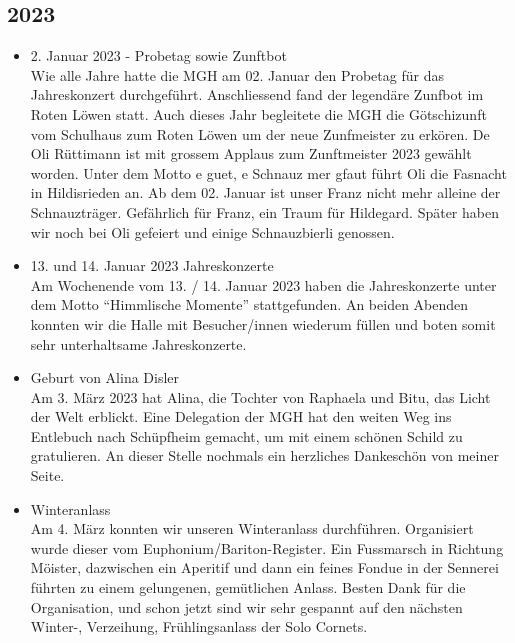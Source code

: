 \subsection*{2023}
\begin{history}


      \begin{itemize}

            \item 2. Januar 2023 - Probetag sowie Zunftbot\\
                  Wie alle Jahre hatte die MGH am 02. Januar den Probetag für
                  das Jahreskonzert durchgeführt. Anschliessend fand der
                  legendäre Zunfbot im Roten Löwen statt. Auch dieses Jahr
                  begleitete die MGH die Götschizunft vom Schulhaus zum Roten
                  Löwen um der neue Zunfmeister zu erkören. De Oli Rüttimann ist
                  mit grossem Applaus zum Zunftmeister 2023 gewählt worden.
                  Unter dem Motto e guet, e Schnauz mer gfaut führt Oli die
                  Fasnacht in Hildisrieden an. Ab dem 02. Januar ist unser Franz
                  nicht mehr alleine der Schnauzträger. Gefährlich für Franz,
                  ein Traum für Hildegard. Später haben wir noch bei Oli
                  gefeiert und einige Schnauzbierli genossen.

            \item 13. und 14. Januar 2023 Jahreskonzerte\\
                  Am Wochenende vom 13. / 14. Januar 2023 haben die
                  Jahreskonzerte unter dem Motto \enquote{Himmlische Momente}
                  stattgefunden. An beiden Abenden konnten wir die Halle mit
                  Besucher/innen wiederum füllen und boten somit sehr
                  unterhaltsame Jahreskonzerte.

            \item  Geburt von Alina Disler\\
                  Am 3. März 2023 hat Alina, die Tochter von Raphaela und Bitu,
                  das Licht der Welt erblickt. Eine Delegation der MGH hat den
                  weiten Weg ins Entlebuch nach Schüpfheim gemacht, um mit einem
                  schönen Schild zu gratulieren. An dieser Stelle nochmals ein
                  herzliches Dankeschön von meiner Seite.

            \item Winteranlass\\
                  Am 4. März konnten wir unseren Winteranlass durchführen.
                  Organisiert wurde dieser vom Euphonium/Bariton-Register. Ein
                  Fussmarsch in Richtung Möister, dazwischen ein Aperitif und
                  dann ein feines Fondue in der Sennerei führten zu einem
                  gelungenen, gemütlichen Anlass. Besten Dank für die
                  Organisation, und schon jetzt sind wir sehr gespannt auf den
                  nächsten Winter-, Verzeihung, Frühlingsanlass der Solo
                  Cornets.


\end{itemize}
\end{history}
